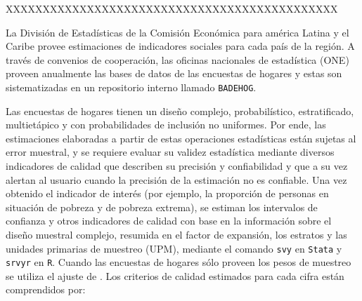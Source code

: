 \documentclass[12pt,spanish,]{book}
\begin{document}
XXXXXXXXXXXXXXXXXXXXXXXXXXXXXXXXXXXXXXXXXXXXX

La División de Estadísticas de la Comisión Económica para américa Latina y el Caribe provee estimaciones de indicadores sociales para cada país de la región. A través de convenios de cooperación, las oficinas nacionales de estadística (ONE) proveen anualmente las bases de datos de las encuestas de hogares y estas son sistematizadas en un repositorio interno llamado \texttt{BADEHOG}.

Las encuestas de hogares tienen un diseño complejo, probabilístico, estratificado, multietápico y con probabilidades de inclusión no uniformes. Por ende, las estimaciones elaboradas a partir de estas operaciones estadísticas están sujetas al error muestral, y se requiere evaluar su validez estadística mediante diversos indicadores de calidad que describen su precisión y confiabilidad y que a su vez alertan al usuario cuando la precisión de la estimación no es confiable. Una vez obtenido el indicador de interés (por ejemplo, la proporción de personas en situación de pobreza y de pobreza extrema), se estiman los intervalos de confianza y otros indicadores de calidad con base en la información sobre el diseño muestral complejo, resumida en el factor de expansión, los estratos y las unidades primarias de muestreo (UPM), mediante el comando \texttt{svy} en \texttt{Stata} y \texttt{srvyr} en \texttt{R}. Cuando las encuestas de hogares sólo proveen los pesos de muestreo se utiliza el ajuste de \textcite{West_McCabe_2012}. Los criterios de calidad estimados para cada cifra están comprendidos por:
\end{document}
